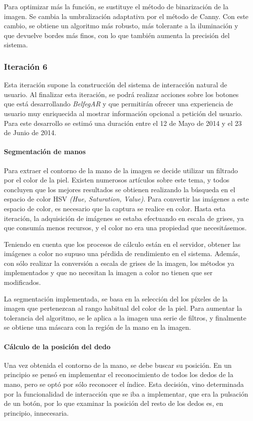 Para optimizar más la función, se sustituye el método de binarización de la imagen. Se cambia la umbralización adaptativa por el método de Canny. Con este cambio, se obtiene un algoritmo más robusto, más tolerante a la iluminación y que devuelve bordes más finos, con lo que también aumenta la precisión del sistema.

\subsubsection{Iteración 6}
Esta iteración supone la construcción del sistema de interacción natural de usuario. Al finalizar esta iteración, se podrá realizar acciones sobre los botones que está desarrollando \textit{BelfegAR} y que permitirán ofrecer una experiencia de usuario muy enriquecida al mostrar información opcional a petición del usuario. Para este desarrollo se estimó una duración entre el 12 de Mayo de 2014 y el 23 de Junio de 2014.

\paragraph{Segmentación de manos}
Para extraer el contorno de la mano de la imagen se decide utilizar un filtrado por el color de la piel. Existen numerosos artículos sobre este tema, y todos concluyen que los mejores resultados se obtienen realizando la búsqueda en el espacio de color HSV \textit{(Hue, Saturation, Value)}. Para convertir las imágenes a este espacio de color, es necesario que la captura se realice en color. Hasta esta iteración, la adquisición de imágenes se estaba efectuando en escala de grises, ya que consumía menos recursos, y el color no era una propiedad que necesitásemos.

Teniendo en cuenta que los procesos de cálculo están en el servidor, obtener las imágenes a color no supuso una pérdida de rendimiento en el sistema. Además, con sólo realizar la conversión a escala de grises de la imagen, los métodos
ya implementados y que no necesitan la imagen a color no tienen que ser modificados.

La segmentación implementada, se basa en la selección del los píxeles de la imagen que pertenezcan al rango habitual del color de la piel. Para aumentar la tolerancia del algoritmo, se le aplica a la imagen una serie de filtros, y finalmente se obtiene una máscara con la región de la mano en la imagen.

\paragraph{Cálculo de la posición del dedo}
Una vez obtenida el contorno de la mano, se debe buscar su posición. En un principio se pensó en implementar el reconocimiento de todos los dedos de la mano, pero se optó por sólo reconocer el índice. Esta decisión, vino determinada por la funcionalidad de interacción que se iba a implementar, que era la pulsación de un botón, por lo que examinar la posición del resto de los dedos es, en principio, innecesaria. 

